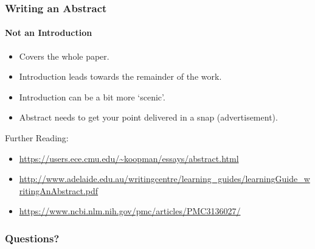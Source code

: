 \documentclass[xcolor={usenames,dvipsnames}]{beamer}
\begin{document}
\begin{frame}
	\frametitle{Writing an Abstract}
	\framesubtitle{Not an Introduction}

	\begin{itemize}
		\item Covers the whole paper.
		\item Introduction leads towards the remainder of the work.
		\item Introduction can be a bit more `scenic'.
		\item Abstract needs to get your point delivered in a snap (advertisement).
	\end{itemize}

	Further Reading:
	\begin{itemize}
		\item \url{https://users.ece.cmu.edu/~koopman/essays/abstract.html}
		\item \url{http://www.adelaide.edu.au/writingcentre/learning_guides/learningGuide_writingAnAbstract.pdf}
		\item \url{https://www.ncbi.nlm.nih.gov/pmc/articles/PMC3136027/}
	\end{itemize}

\end{frame}

\begin{frame}
	\frametitle{Questions?}
\end{frame}
\end{document}
